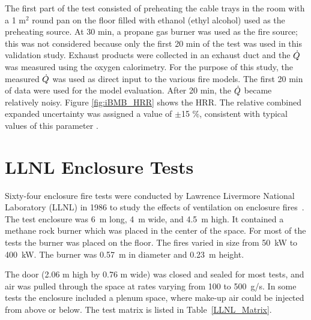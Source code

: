 The first part of the test consisted of preheating the cable trays in the room with a 1 m$^2$ round pan on the floor filled with ethanol (ethyl alcohol) used as the preheating source.  At 30 min, a propane gas burner was used as the fire source; this was not considered because only the first 20 min of the test was used in this validation study.
Exhaust products were collected in an exhaust duct and the $\dot{Q}$  was measured using the oxygen calorimetry.  For the purpose of this study, the measured $\dot{Q}$ was used as direct input to the various fire models.  The first 20 min of data were used for the model evaluation. After 20 min, the  $\dot{Q}$ became relatively noisy.  Figure \ref{fig:iBMB_HRR} shows the HRR. The relative combined expanded uncertainty was assigned a value of $\pm$15 \%, consistent with typical values of this parameter \cite{NRCNUREG1824}.

\section{LLNL Enclosure Tests}

Sixty-four enclosure fire tests were conducted by Lawrence Livermore National Laboratory (LLNL) in 1986 to study the effects of ventilation on enclosure fires~\cite{Foote:LLNL1986}. The test
enclosure was 6~m long, 4~m wide, and 4.5~m high. It contained a methane rock burner which was placed in the center of the space. For most of the tests the burner was placed on the
floor. The fires varied in size from 50~kW to 400~kW. The burner was 0.57~m in diameter and 0.23~m height.

The door (2.06 m high by 0.76 m wide) was closed and sealed for most tests, and air was pulled through the space at rates varying from 100 to 500~g/s. In some tests the enclosure included a plenum space, where
make-up air could be injected from above or below. The test matrix is listed in Table~\ref{LLNL_Matrix}.

